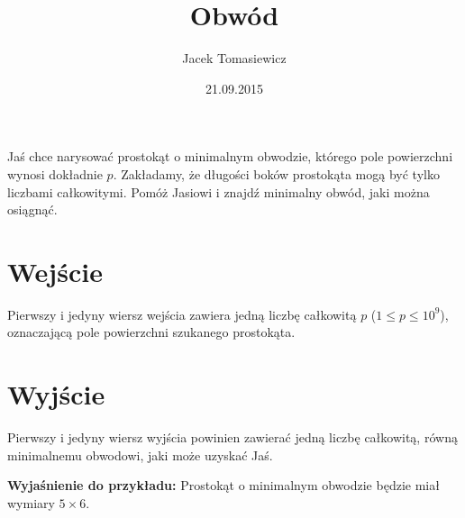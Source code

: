 \documentclass[zad,zawodnik,utf8]{sinol}
\title{Obwód}
\author{Jacek Tomasiewicz} %
\date{21.09.2015}
\begin{document}
  \begin{tasktext}%
Jaś chce narysować prostokąt o minimalnym obwodzie, którego pole powierzchni wynosi dokładnie
$p$. Zakładamy, że długości boków prostokąta mogą być tylko liczbami całkowitymi.
Pomóż Jasiowi i znajdź minimalny obwód, jaki można osiągnąć.

  \section{Wejście}
Pierwszy i jedyny wiersz wejścia zawiera jedną liczbę całkowitą $p$ ($1 \leq p \leq 10^9$), oznaczającą
pole powierzchni szukanego prostokąta.

  \section{Wyjście}
Pierwszy i jedyny wiersz wyjścia powinien zawierać jedną liczbę całkowitą, równą minimalnemu
obwodowi, jaki może uzyskać Jaś.

     \makecompactexample    
	 
\medskip
\noindent
\textbf{Wyjaśnienie do przykładu:} Prostokąt o minimalnym obwodzie będzie miał wymiary $5 \times 6$.

  \end{tasktext}
\end{document}
